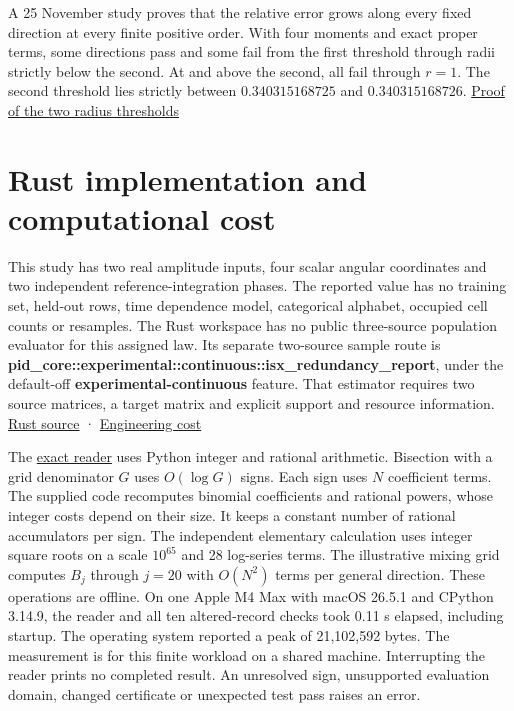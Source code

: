 A 25 November study proves that the relative error grows along every fixed direction at every finite positive order. With four moments and exact proper terms, some directions pass and some fail from the first threshold through radii strictly below the second. At and above the second, all fail through \(r=1\). The second threshold lies strictly between \(0.340315168725\) and \(0.340315168726\). \href{https://github.com/sepahead/pid-rs/blob/main/audit/research/angular-ray-monotonicity/EXPOSITION.md}{Proof of the two radius thresholds}

\clearpage

\section{Rust implementation and computational cost}\label{rust-implementation-and-computational-cost}

This study has two real amplitude inputs, four scalar angular coordinates and two independent reference-integration phases. The reported value has no training set, held-out rows, time dependence model, categorical alphabet, occupied cell counts or resamples. The Rust workspace has no public three-source population evaluator for this assigned law. Its separate two-source sample route is \textbf{pid\_core::experimental::continuous::isx\_redundancy\_report}, under the default-off \textbf{experimental-continuous} feature. That estimator requires two source matrices, a target matrix and explicit support and resource information. \href{https://github.com/sepahead/pid-rs/blob/main/crates/pid-core/src/isx.rs}{Rust source} · \href{https://github.com/sepahead/pid-rs/blob/main/RUST_IMPLEMENTATION_AND_COST.md}{Engineering cost}

The \href{https://github.com/sepahead/pid-rs/blob/main/audit/research/angular-truncation-extremum/replay.py}{exact reader} uses Python integer and rational arithmetic. Bisection with a grid denominator \(G\) uses \(O(\log G)\) signs. Each sign uses \(N\) coefficient terms. The supplied code recomputes binomial coefficients and rational powers, whose integer costs depend on their size. It keeps a constant number of rational accumulators per sign. The independent elementary calculation uses integer square roots on a scale \(10^{65}\) and 28 log-series terms. The illustrative mixing grid computes \(B_j\) through \(j=20\) with \(O(N^2)\) terms per general direction. These operations are offline. On one Apple M4 Max with macOS 26.5.1 and CPython 3.14.9, the reader and all ten altered-record checks took 0.11 s elapsed, including startup. The operating system reported a peak of 21,102,592 bytes. The measurement is for this finite workload on a shared machine. Interrupting the reader prints no completed result. An unresolved sign, unsupported evaluation domain, changed certificate or unexpected test pass raises an error.

